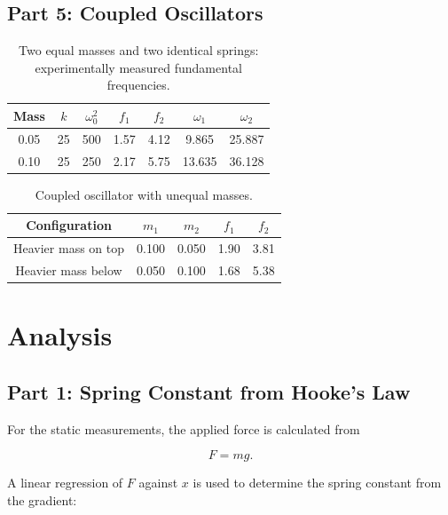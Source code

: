 \documentclass[12pt,a4paper]{article}
\begin{document}
\subsection{Part 5: Coupled Oscillators}

\begin{table}[H]
    \centering
    \caption{Two equal masses and two identical springs: experimentally measured fundamental frequencies.}
    \begin{tabular}{ccccccc}
    \toprule
    Mass & $k$ & $\omega_0^2$ & $f_1$ & $f_2$ & $\omega_1$ & $\omega_2$ \\
    \midrule
    0.05 & 25 & 500 & 1.57 & 4.12 & 9.865 & 25.887 \\
    0.10 & 25 & 250 & 2.17 & 5.75 & 13.635 & 36.128 \\
    \bottomrule
    \end{tabular}
\end{table}


\begin{table}[H]
\centering
\caption{Coupled oscillator with unequal masses.}
\begin{tabular}{ccccc}
\toprule
Configuration & $m_1$ & $m_2$ & $f_1$ & $f_2$ \\
\midrule
Heavier mass on top & 0.100 & 0.050 & 1.90 &  3.81 \\
Heavier mass below & 0.050 & 0.100 & 1.68 & 5.38 \\ 
\bottomrule
\end{tabular}
\end{table}


\newpage

\section{Analysis}

\subsection{Part 1: Spring Constant from Hooke's Law}

For the static measurements, the applied force is calculated from

\begin{equation}
F=mg.
\end{equation}

A linear regression of $F$ against $x$ is used to determine the spring constant from the gradient:
\end{document}

